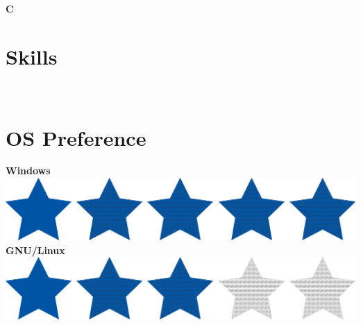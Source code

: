 \documentclass[a4paper]{friggeri-cv}
\begin{document}
\begin{aside}
        \textbf{C}%
        ~
        \section{Skills}\label{sec:skills}
        ~
        \section{OS Preference}\label{sec:os-preference}
        \textbf{Windows}\includegraphics[scale=0.33]{../assets/images/5stars.png}
        \textbf{GNU/Linux}\includegraphics[scale=0.33]{../assets/images/3stars.png}
        ~

\end{aside}
\end{document}
